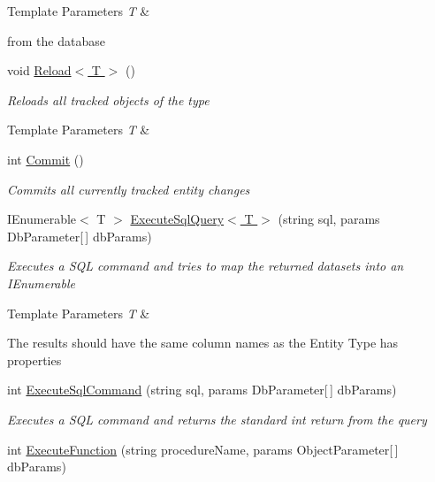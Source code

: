 \begin{DoxyCompactItemize}
\begin{DoxyCompactList}
\begin{DoxyTemplParams}{Template Parameters}
{\em T} & \\
\hline
\end{DoxyTemplParams}
from the database \end{DoxyCompactList}\item 
void \hyperlink{class_framework_extension_1_1_entity_framework_1_1_contexts_1_1_entity_framework_context_a87a885ec11e09fce2f7f220e6c98f994}{Reload$<$ T $>$} ()
\begin{DoxyCompactList}\small\item\em Reloads all tracked objects of the type 
\begin{DoxyTemplParams}{Template Parameters}
{\em T} & \\
\hline
\end{DoxyTemplParams}
\end{DoxyCompactList}\item 
int \hyperlink{class_framework_extension_1_1_entity_framework_1_1_contexts_1_1_entity_framework_context_ac7563d83d7010a5f8da3168cf43fe5be}{Commit} ()
\begin{DoxyCompactList}\small\item\em Commits all currently tracked entity changes \end{DoxyCompactList}\item 
I\-Enumerable$<$ T $>$ \hyperlink{class_framework_extension_1_1_entity_framework_1_1_contexts_1_1_entity_framework_context_a307fa6de8b9356b1d0addf4e2fd35b17}{Execute\-Sql\-Query$<$ T $>$} (string sql, params Db\-Parameter\mbox{[}$\,$\mbox{]} db\-Params)
\begin{DoxyCompactList}\small\item\em Executes a S\-Q\-L command and tries to map the returned datasets into an I\-Enumerable
\begin{DoxyTemplParams}{Template Parameters}
{\em T} & \\
\hline
\end{DoxyTemplParams}
The results should have the same column names as the Entity Type has properties \end{DoxyCompactList}\item 
int \hyperlink{class_framework_extension_1_1_entity_framework_1_1_contexts_1_1_entity_framework_context_a322a4ad4a30196edfd0f7aed48b9bf73}{Execute\-Sql\-Command} (string sql, params Db\-Parameter\mbox{[}$\,$\mbox{]} db\-Params)
\begin{DoxyCompactList}\small\item\em Executes a S\-Q\-L command and returns the standard int return from the query \end{DoxyCompactList}\item 
int \hyperlink{class_framework_extension_1_1_entity_framework_1_1_contexts_1_1_entity_framework_context_a8348891845aee02967ca1d4c1c1ec786}{Execute\-Function} (string procedure\-Name, params Object\-Parameter\mbox{[}$\,$\mbox{]} db\-Params)
\begin{DoxyCompactList}\small\item\em \end{DoxyCompactList}\end{DoxyCompactItemize}
